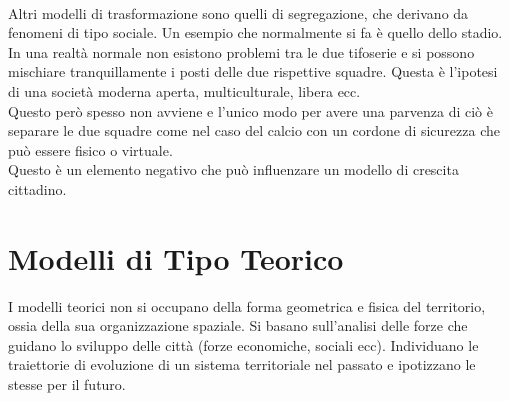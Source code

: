 \documentclass[a4paper,12pt, oneside]{book}
\begin{document}
  \leavevmode\\
  Altri modelli di trasformazione sono quelli di segregazione, che derivano da fenomeni di tipo sociale. Un esempio che normalmente si fa è quello dello stadio.\\
  In una realtà normale non esistono problemi tra le due tifoserie e si possono mischiare tranquillamente i posti delle due rispettive squadre. Questa è l'ipotesi di una società moderna aperta, multiculturale, libera ecc.\\
  Questo però spesso non avviene e l'unico modo per avere una parvenza di ciò è separare le due squadre come nel caso del calcio con un cordone di sicurezza che può essere fisico o virtuale.\\
  Questo è un elemento negativo che può influenzare un modello di crescita cittadino.
  \chapter{Modelli di Tipo Teorico}
  I modelli teorici non si occupano della forma geometrica e fisica del territorio, ossia della sua organizzazione spaziale. Si basano sull'analisi delle forze che guidano lo sviluppo delle città (forze economiche, sociali ecc). Individuano le traiettorie di evoluzione di un sistema territoriale nel passato e ipotizzano le stesse per il futuro.\\
\end{document}

